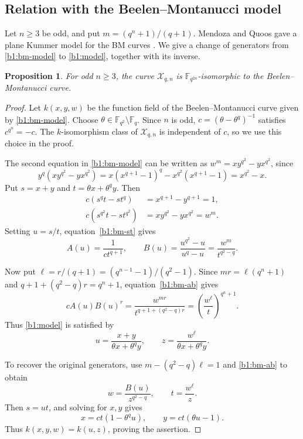 \documentclass[12pt,reqno]{amsart}
\numberwithin{equation}{section}
\newcommand{\F}{\mathbb F}
\theoremstyle{plain}
\newtheorem{proposition}[theorem]{Proposition}
\theoremstyle{definition}
\theoremstyle{remark}
\begin{document}
\subsection{Relation with the Beelen--Montanucci model}

Let \(n\ge3\) be odd, and put \(m=(q^n+1)/(q+1)\).
Mendoza and Quoos gave a plane Kummer model for the BM curves
\cite[Corollary~3.3]{MQ2022}.
We give a change of generators from \eqref{b1:bm-model} to
\eqref{b1:model}, together with its inverse.

\begin{proposition}
\label{b1:bm-identification}
For odd \(n\ge3\), the curve \(\mathcal X_{q,n}\) is
\(\F_{q^{2n}}\)-isomorphic to the Beelen--Montanucci curve.
\end{proposition}

\begin{proof}
Let \(k(x,y,w)\) be the function field of the Beelen--Montanucci
curve given by \eqref{b1:bm-model}.
Choose \(\theta\in\F_{q^2}\setminus\F_q\). Since \(n\) is odd,
\(c=(\theta-\theta^q)^{-1}\) satisfies \(c^{q^n}=-c\).
The \(k\)-isomorphism class of \(\mathcal X_{q,n}\) is independent
of \(c\), so we use this choice in the proof.

The second equation in \eqref{b1:bm-model} can be written as
\(w^m=xy^{q^2}-yx^{q^2}\), since
\[
 y^q(xy^{q^2}-yx^{q^2})
 =x(x^{q+1}-1)^q-x^{q^2}(x^{q+1}-1)
 =x^{q^2}-x.
\]
Put \(s=x+y\) and \(t=\theta x+\theta^qy\). Then
\begin{equation}
\label{b1:bm-st}
 \begin{aligned}
 c(s^qt-st^q)&=x^{q+1}-y^{q+1}=1,\\
 c(s^{q^2}t-st^{q^2})&=xy^{q^2}-yx^{q^2}=w^m.
 \end{aligned}
\end{equation}
Setting \(u=s/t\), equation~\eqref{b1:bm-st} gives
\begin{equation}
\label{b1:bm-ab}
 A(u)=\frac{1}{ct^{q+1}},\qquad
 B(u)=\frac{u^{q^2}-u}{u^q-u}=\frac{w^m}{t^{q^2-q}}.
\end{equation}

Now put \(\ell=r/(q+1)=(q^{n-1}-1)/(q^2-1)\).
Since \(mr=\ell(q^n+1)\) and
\(q+1+(q^2-q)r=q^n+1\), equation~\eqref{b1:bm-ab} gives
\[
 cA(u)B(u)^r
 =\frac{w^{mr}}{t^{q+1+(q^2-q)r}}
 =\left(\frac{w^\ell}{t}\right)^{q^n+1}.
\]
Thus \eqref{b1:model} is satisfied by
\begin{equation}
\label{b1:bm-change}
 u=\frac{x+y}{\theta x+\theta^qy},\qquad
 z=\frac{w^\ell}{\theta x+\theta^qy}.
\end{equation}

To recover the original generators, use
\(m-(q^2-q)\ell=1\) and \eqref{b1:bm-ab} to obtain
\[
 w=\frac{B(u)}{z^{q^2-q}},\qquad t=\frac{w^\ell}{z}.
\]
Then \(s=ut\), and solving for \(x,y\) gives
\[
 x=ct(1-\theta^qu),\qquad y=ct(\theta u-1).
\]
Thus \(k(x,y,w)=k(u,z)\), proving the assertion.
\end{proof}
\end{document}

